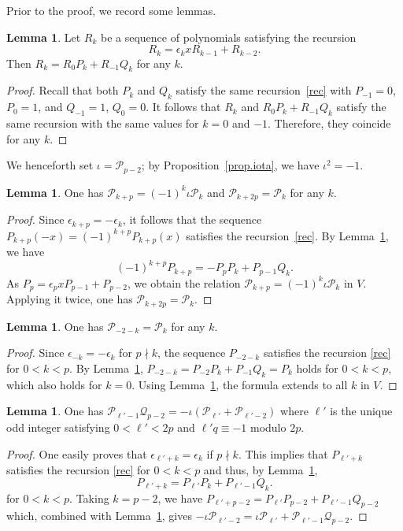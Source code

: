 \documentclass{amsart}
\def\calP{\mathcal{P}}
\def\calQ{\mathcal{Q}}
\theoremstyle{definition}
\newtheorem{Lemma}[Theorem]{Lemma}
\begin{document}
Prior to the proof, we record some lemmas. 
\begin{Lemma}
\label{lem.R}
Let $R_k$ be a sequence of polynomials satisfying the recursion
\begin{equation}\label{rec}
R_k=\epsilon_k x R_{k-1}+R_{k-2} .
\end{equation}
Then $R_k = R_0P_k + R_{-1}Q_k$ for any $k$.
\end{Lemma}
\begin{proof}
Recall that both $P_k$ and $Q_k$ satisfy the same recursion~\eqref{rec} with $P_{-1}=0$, $P_0=1$, and $Q_{-1}=1$, $Q_0=0$. It follows that $R_k$ and $R_0P_k + R_{-1}Q_k$ satisfy the same recursion with the same values for $k=0$ and $-1$. Therefore, they coincide for any $k$.
\end{proof}

We henceforth set $\iota = \calP_{p-2}$; by Proposition~\ref{prop.iota}, we have $\iota^{2} = -1$.

\begin{Lemma}
\label{lem.e1}
    One has $\calP_{k+p}=(-1)^{k}\iota \calP_k$ and $\calP_{k+2p} = \calP_k$ for any $k$.
\end{Lemma}
\begin{proof}
Since $\epsilon_{k+p} = -\epsilon_k$, it follows that the sequence $P_{k+p}(-x) = (-1)^{k+p} P_{k+p}(x)$ satisfies the recursion~\eqref{rec}. By Lemma~\ref{lem.R}, we have
$$(-1)^{k+p}P_{k+p}= -P_p P_{k}+P_{p-1}Q_k.$$
As $P_p=\epsilon_p x P_{p-1}+P_{p-2}$, we obtain the relation $\calP_{k+p}=(-1)^{k}\iota \calP_k$ in $V$. Applying it twice, one has $\calP_{k+2p}=\calP_k$.
\end{proof}

\begin{Lemma}
\label{lem.e2}
One has $\calP_{-2-k}=\calP_k$ for any $k$.
\end{Lemma}
\begin{proof}
Since $\epsilon_{-k}=-\epsilon_k$ for $p\nmid k$, the sequence $P_{-2-k}$ satisfies the recursion \eqref{rec} for $0<k<p$. By Lemma~\ref{lem.R}, $P_{-2-k}=P_{-2}P_k+P_{-1}Q_k = P_{k}$ holds for $0 < k <p$, which also holds for $k=0$. Using Lemma~\ref{lem.e1}, the formula extends to all $k$ in $V$.
\end{proof}


\begin{Lemma}\label{omega}
One has $\calP_{\ell'-1} \calQ_{p-2}=-\iota(\calP_{\ell'}+\calP_{\ell'-2})$
where $\ell'$ is the unique odd integer satisfying $0<\ell'<2p$ and $\ell'q \equiv-1$ modulo $2p$. 
\end{Lemma}
\begin{proof}
One easily proves that $\epsilon_{\ell'+k}=\epsilon_k$ if $p\nmid k$. This implies that $P_{\ell'+k}$ satisfies the recursion \eqref{rec} for $0<k<p$ and thus, by Lemma~\ref{lem.R}, 
\begin{equation*}
P_{\ell'+k}=P_{\ell'}P_k+P_{\ell'-1}Q_k.
\end{equation*}
for $0<k<p$.  
Taking $k=p-2$, we have $P_{\ell'+p-2}=P_{\ell'}P_{p-2}+P_{\ell'-1}Q_{p-2}$ which, combined with Lemma~\ref{lem.e1}, gives $-\iota \calP_{\ell'-2}=\iota\calP_{\ell'}+\calP_{\ell'-1} \calQ_{p-2}$.
\end{proof}
\end{document}
